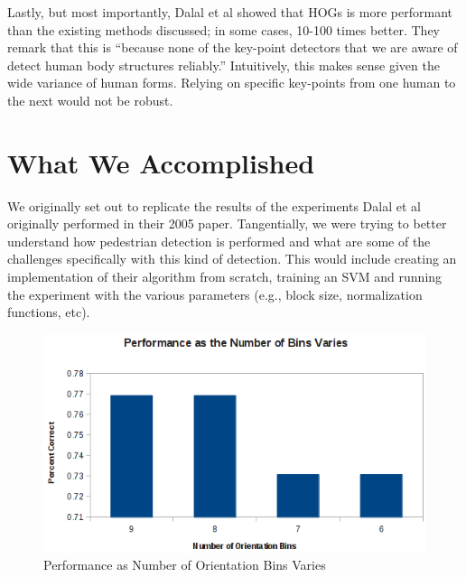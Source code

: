 \documentclass[a4paper,11pt]{article}
\begin{document}
\begin{multicols}{2}
Lastly, but most importantly, Dalal et al showed that HOGs is more performant than the existing methods 
discussed; in some cases, 10-100 times better. They remark that this is ``because none of the key-point 
detectors that we are aware of detect human body structures reliably.'' Intuitively, this makes sense 
given the wide variance of human forms. Relying on specific key-points from one human to the next would not be robust. 

\section{What We Accomplished}
We originally set out to replicate the results of the experiments Dalal et al originally performed in their 
2005 paper. Tangentially, we were trying to better understand how pedestrian detection is performed and what 
are some of the challenges specifically with this kind of detection. This would include creating an 
implementation of their algorithm from scratch, training an SVM and running the experiment with the 
various parameters (e.g., block size, normalization functions, etc).

\end{multicols}
\begin{figure}[t]
  \includegraphics[scale=0.75]{performance_vs_numbins.png}
  \caption{Performance as Number of Orientation Bins Varies}
  \label{NumBins-vs-Performance}
\end{figure}
\end{document}
